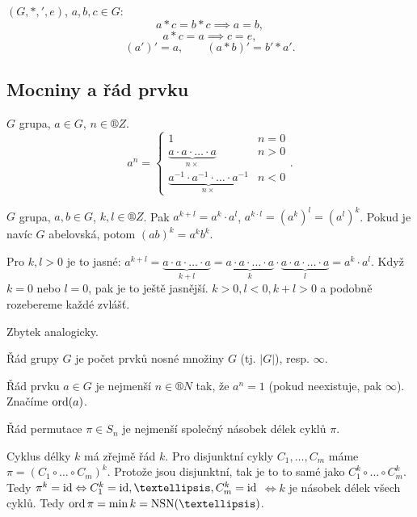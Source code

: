 \documentclass[12pt]{article}                   %
\begin{document}
        \begin{tvrzeni}
            $(G, *, ', e)$, $a, b, c \in G$:
            $$ a*c = b*c \implies a = b, $$
            $$ a*c = a \implies c = e, $$ 
            $$ (a')' = a, \qquad (a*b)' = b'*a'. $$
        \end{tvrzeni}

    \subsection{Mocniny a řád prvku}
        \begin{definice}
            $G$ grupa, $a \in G$, $n \in ®Z$.
            $$ a^n = \begin{cases} 1 & n = 0 \\ \underbrace{a·a·…·a}_{n\times} & n > 0 \\ \underbrace{a^{-1}·a^{-1}·…·a^{-1}}_{n\times} & n < 0 \end{cases}. $$ 
        \end{definice}

        \begin{tvrzeni}
            $G$ grupa, $a, b \in G$, $k, l \in ®Z$. Pak $a^{k+l} = a^k·a^l$, $a^{k·l} = (a^k)^l = (a^l)^k$. Pokud je navíc $G$ abelovská, potom $(ab)^k = a^kb^k$.

            \begin{dukazin}
                Pro $k, l > 0$ je to jasné: $a^{k+l} = \underbrace{a·a·…·a}_{k+l} = \underbrace{a·a·…·a}_{k}·\underbrace{a·a·…·a}_{l} = a^k·a^l$. Když $k = 0$ nebo $l = 0$, pak je to ještě jasnější. $k > 0, l < 0, k+l>0$ a podobně rozebereme každé zvlášť.

                Zbytek analogicky.
            \end{dukazin}
        \end{tvrzeni}

        \begin{definice}
            Řád grupy $G$ je počet prvků nosné množiny $G$ (tj. $|G|$), resp. $∞$.

            Řád prvku $a \in G$ je nejmenší $n \in ®N$ tak, že $a^n = 1$ (pokud neexistuje, pak $∞$). Značíme $\operatorname{ord}(a)$.
        \end{definice}

        \begin{tvrzeni}
            Řád permutace $\pi \in S_n$ je nejmenší společný násobek délek cyklů $\pi$.

            \begin{dukazin}
                Cyklus délky $k$ má zřejmě řád $k$. Pro disjunktní cykly $C_1, …, C_m$ máme $\pi = (C_1 \circ … \circ C_m)^k$. Protože jsou disjunktní, tak je to to samé jako $C_1^k \circ … \circ C_m^k$. Tedy $\pi^k = \id \Leftrightarrow C_1^k = \id, …, C_m^k = \id$ $\Leftrightarrow k$ je násobek délek všech cyklů. Tedy $\ord \pi = \min k = \NSN(…)$.
            \end{dukazin}
        \end{tvrzeni}
\end{document}
